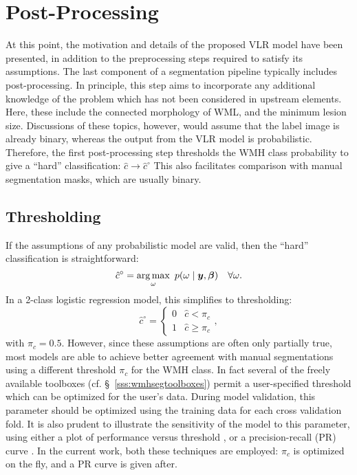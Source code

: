 \section{Post-Processing}\label{s:meth-post}
At this point, the motivation and details of the proposed VLR model have been presented, in addition to the preprocessing steps required to satisfy its assumptions.
The last component of a segmentation pipeline typically includes post-processing. 
In principle, this step aims to incorporate any additional knowledge of the problem which has not been considered in upstream elements.
Here, these include the connected morphology of WML, and the minimum lesion size.
Discussions of these topics, however, would assume that the label image is already binary, whereas the output from the VLR model is probabilistic.
Therefore, the first post-processing step thresholds the WMH class probability to give a ``hard'' classification: $\hat{c}\rightarrow \hat{c}^{\circ}$
This also facilitates comparison with manual segmentation masks, which are usually binary.
\subsection{Thresholding}\label{ss:meth-thr}
If the assumptions of any probabilistic model are valid, then the ``hard'' classification is straightforward:
\begin{equation}
  \hat{c}^{\circ} = \underset{\omega}{\arg\max}\enspace p(\omega\mid\bm{y},\bm{\beta})\quad\forall \omega.
\end{equation}
In a 2-class logistic regression model, this simplifies to thresholding:
\begin{equation}
  \hat{c}^{\circ} = \begin{cases} 0 & \hat{c} < \pi_c \\ 1 & \hat{c} \ge \pi_c \end{cases},
\end{equation}
with $\pi_c = 0.5$.
However, since these assumptions are often only partially true, most models are able to achieve better agreement with manual segmentations using a different threshold $\pi_c$ for the WMH class.
In fact several of the freely available toolboxes (cf. \S\ \ref{sss:wmhsegtoolboxes}) permit a user-specified threshold which can be optimized for the user's data.
During model validation, this parameter should be optimized using the training data for each cross validation fold.
It is also prudent to illustrate the sensitivity of the model to this parameter, using either a plot of performance versus threshold \cite{Steenwijk2013}, or a precision-recall (PR) curve \cite{Arbelaez2011}.
In the current work, both these techniques are employed: $\pi_c$ is optimized on the fly, and a PR curve is given after.
